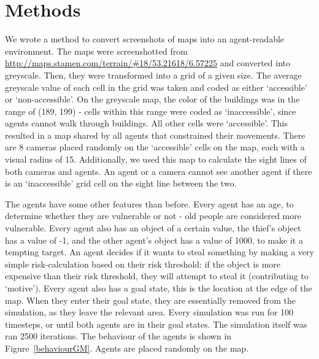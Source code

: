 \section{Methods}

We wrote a method to convert screenshots of maps into an agent-readable environment. The maps were screenshotted from \url{http://maps.stamen.com/terrain/#18/53.21618/6.57225} and converted into greyscale. Then, they were transformed into a grid of a given size. The average greyscale value of each cell in the grid was taken and coded as either `accessible' or `non-accessible'. On the greyscale map, the color of the buildings was in the range of (189, 199) - cells within this range were coded as `inaccessible', since agents cannot walk through buildings. All other cells were `accessible'. This resulted in a map shared by all agents that constrained their movements. There are 8 cameras placed randomly on the `accessible' cells on the map, each with a visual radius of 15. Additionally, we used this map to calculate the sight lines of both cameras and agents. An agent or a camera cannot see another agent if there is an `inaccessible' grid cell on the sight line between the two.

The agents have some other features than before. Every agent has an age, to determine whether they are vulnerable or not - old people are considered more vulnerable. Every agent also has an object of a certain value, the thief's object has a value of -1, and the other agent's object has a value of 1000, to make it a tempting target. An agent decides if it wants to steal something by making a very simple risk-calculation based on their risk threshold: if the object is more expensive than their risk threshold, they will attempt to steal it (contributing to `motive'). Every agent also has a goal state, this is the location at the edge of the map. When they enter their goal state, they are essentially removed from the simulation, as they leave the relevant area. Every simulation was run for 100 timesteps, or until both agents are in their goal states. The simulation itself was ran 2500 iterations. The behaviour of the agents is shown in Figure~\ref{behaviourGM}. Agents are placed randomly on the map.


